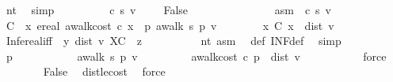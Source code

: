 \begin{isabellebody}
\ nt\ \isamarkupfalse%
\ simp\isanewline
\ \ \isamarkupfalse%
\isanewline
\ \ \ \ \isamarkupfalse%
\ {\isachardoublequoteopen}{\isasymmu}\ c\ s\ v\ {\isacharequal}\ {\isacharminus}\ {\isasyminfinity}\ {\isasymLongrightarrow}\ False{\isachardoublequoteclose}\ \isanewline
\ \ \ \ \isamarkupfalse%
\ {\isacharminus}\isanewline
\ \ \ \ \ \ \isamarkupfalse%
\ asm{\isacharcolon}\ {\isachardoublequoteopen}{\isasymmu}\ c\ s\ v\ {\isacharequal}\ {\isacharminus}\ {\isasyminfinity}{\isachardoublequoteclose}\isanewline
\ \ \ \ \ \ \isamarkupfalse%
\ {\isacharquery}C\ {\isacharequal}\ {\isachardoublequoteopen}{\isacharparenleft}{\isasymlambda}x{\isachardot}\ ereal\ {\isacharparenleft}awalk{\isacharunderscore}cost\ c\ x{\isacharparenright}{\isacharparenright}\ {\isacharbackquote}\ {\isacharbraceleft}p{\isachardot}\ awalk\ s\ p\ v{\isacharbraceright}{\isachardoublequoteclose}\isanewline
\ \ \ \ \ \ \isamarkupfalse%
\ {\isachardoublequoteopen}{\isasymexists}x{\isasymin}\ {\isacharquery}C{\isachardot}\ x\ {\isacharless}\ dist\ v{\isachardoublequoteclose}\ \isanewline
\ \ \ \ \ \ \ \ \isamarkupfalse%
\ Inf{\isacharunderscore}ereal{\isacharunderscore}iff\ {\isacharbrackleft}\ y\ {\isacharequal}{\isachardoublequoteopen}dist\ v{\isachardoublequoteclose}\ X{\isacharequal}{\isachardoublequoteopen}{\isacharquery}C{\isachardoublequoteclose}\ \ z{\isacharequal}\ {\isachardoublequoteopen}{\isacharminus}{\isasyminfinity}{\isachardoublequoteclose}{\isacharbrackright}\ \isanewline
\ \ \ \ \ \ \ \ nt\ asm\ \isamarkupfalse%
\ {\isasymmu}{\isacharunderscore}def\ INF{\isacharunderscore}def\ \isamarkupfalse%
\ simp\isanewline
\ \ \ \ \ \ \isamarkupfalse%
\ \isamarkupfalse%
\ p\ \ \ \isanewline
\ \ \ \ \ \ \ \ {\isachardoublequoteopen}awalk\ s\ p\ v{\isachardoublequoteclose}\ \isanewline
\ \ \ \ \ \ \ \ {\isachardoublequoteopen}awalk{\isacharunderscore}cost\ c\ p\ {\isacharless}\ dist\ v{\isachardoublequoteclose}\ \isanewline
\ \ \ \ \ \ \ \ \isamarkupfalse%
\ force\isanewline
\ \ \ \ \ \ \isamarkupfalse%
\ False\ \isamarkupfalse%
\ dist{\isacharunderscore}le{\isacharunderscore}cost\ \isamarkupfalse%
\ force\isanewline
\ \ \ \ \isamarkupfalse%
\isanewline
\ \ \isamarkupfalse%
\isanewline
{}\isamarkupfalse%
%

\end{isabellebody}
